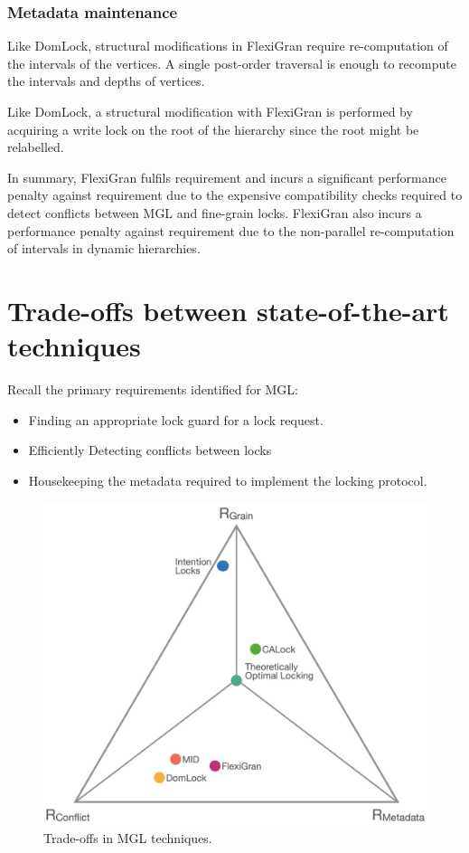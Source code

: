 \subsubsection{Metadata maintenance}

Like DomLock, structural modifications in FlexiGran require re-computation of the intervals of the vertices. A single post-order traversal is enough to recompute the intervals and depths of vertices. 

Like DomLock, a structural modification with FlexiGran is performed by acquiring a write lock on the root of the hierarchy since the root might be relabelled.

In summary, FlexiGran fulfils requirement \Rb and incurs a significant performance penalty against requirement \Rc due to the expensive compatibility checks required to detect conflicts between MGL and fine-grain locks. FlexiGran also incurs a performance penalty against requirement \Rd due to the non-parallel re-computation of intervals in dynamic hierarchies.

\newpage

\section{Trade-offs between state-of-the-art techniques}

Recall the primary requirements identified for MGL:
\begin{itemize}
    \item[\Rb] Finding an appropriate lock guard for a lock request.
    \item[\Rc] Efficiently Detecting conflicts between locks
    \item[\Rd] Housekeeping the metadata required to implement the locking protocol.
\end{itemize}

\begin{figure}[h]
    \centering
    \captionsetup{justification=centering}
    \includegraphics[width=.9\textwidth]{figures/MGL_comparision.png}
    \caption{Trade-offs in MGL techniques.}
    \label{fig:tradeoffs}
\end{figure}


